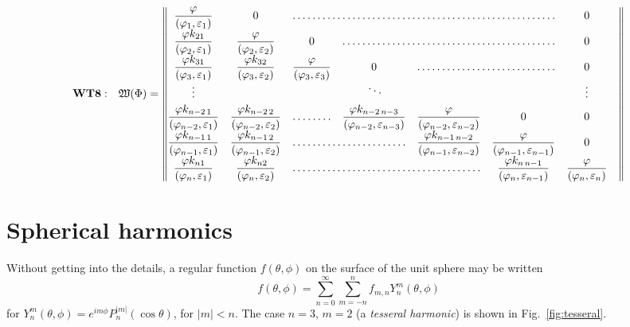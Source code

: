 \begin{widetext}[][b]
\begin{equation}\label{eqn:WT8}
\mathbf{WT8:}\quad
\mathfrak{W}(\bm{\Phi})= \begin{Vmatrix}
\dfrac\varphi{(\varphi_1,\varepsilon_1)}			& 0 												& \hdotsfor{4} 	& 0 			&	\\[\jot]
\dfrac{\varphi k_{21}}{(\varphi_2,\varepsilon_1)}	& \dfrac\varphi{(\varphi_2,\varepsilon_2)}			& 0 			& \hdotsfor{3} 	& 0 \\[\jot]
\dfrac{\varphi k_{31}}{(\varphi_3,\varepsilon_1)}	&\dfrac{\varphi k_{32}}{(\varphi_3,\varepsilon_2)}	& \dfrac\varphi{(\varphi_3,\varepsilon_3)}& 0 & \hdotsfor{2} & 0 \\[\jot]
\vdots 	&  &  & \smash{\rotatebox{15}{$\ddots$}} &  & & \vdots \\[\jot]
\dfrac{\varphi k_{n-2\, 1}}{(\varphi_{n-2},\varepsilon_1)}	&
\dfrac{\varphi k_{n-2\, 2}}{(\varphi_{n-2},\varepsilon_2)}	&\hdotsfor{1} & \dfrac{\varphi k_{n-2\,n-3}}{(\varphi_{n-2},\varepsilon_{n-3})} & \dfrac\varphi{(\varphi_{n-2},\varepsilon_{n-2})}& 0& 0 \\[\jot]
\dfrac{\varphi k_{n-1\, 1}}{(\varphi_{n-1},\varepsilon_1)}	& \dfrac{\varphi k_{n-1\, 2}}{(\varphi_{n-1},\varepsilon_2)} &\hdotsfor{2} & 
\dfrac{\varphi k_{n-1\,n-2}}{(\varphi_{n-1},\varepsilon_{n-2})}& \dfrac{\varphi}{(\varphi_{n-1},\varepsilon_{n-1})} & 0 \\[\jot]
\dfrac{\varphi k_{n1}}{(\varphi_n,\varepsilon_1)}	& \dfrac{\varphi k_{n2}}{(\varphi_n,\varepsilon_2)}	& \hdotsfor{3}	&
\dfrac{\varphi k_{n\,n-1}}{(\varphi_n,\varepsilon_{n-1})} & \dfrac{\varphi}{(\varphi_n,\varepsilon_n)}
\end{Vmatrix}
\end{equation}
\end{widetext}

\lipsum[55-56]

\appendix  
\section{Spherical harmonics}\label{sec:sph-har}

Without getting into the details, a regular function $f(\theta,\phi)$ on the surface of the unit sphere may be written
\begin{equation}
f(\theta,\phi) = \sum_{n=0}^\infty \sum_{m=-n}^n f_{m,n} Y_n^m(\theta,\phi)
\end{equation}
for $Y_n^m(\theta,\phi) = e^{i m\phi}P^{|m|}_n(\cos\theta)$, for $|m|<n$. The case $n=3$, $m=2$ (a \textit{tesseral harmonic}) is shown in Fig.~\ref{fig:tesseral}.

